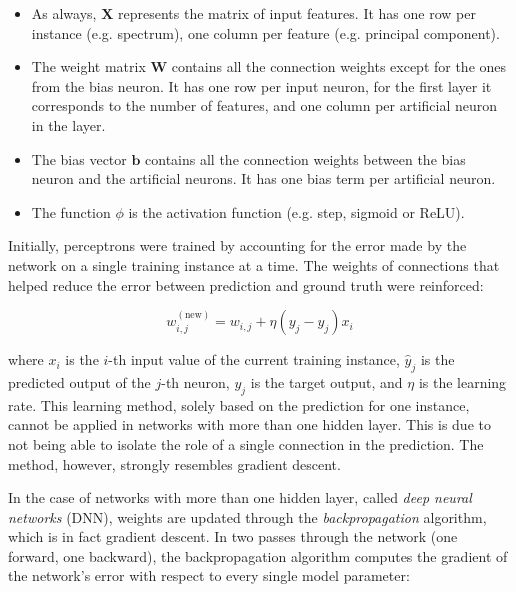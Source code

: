 \begin{itemize}
    \item As always, $\mathbf{X}$ represents the matrix of input features. It has one row per instance (e.g. spectrum), one column per feature (e.g. principal component).
    \item The weight matrix $\mathbf{W}$ contains all the connection weights except for the ones from the bias neuron. It has one row per input neuron, for the first layer it corresponds to the number of features, and one column per artificial neuron in the layer.
    \item The bias vector $\mathbf{b}$ contains all the connection weights between the bias neuron and the artificial neurons. It has one bias term per artificial neuron.
    \item The function $\phi$ is the activation function (e.g. step, sigmoid or ReLU).
\end{itemize}

Initially, perceptrons were trained by accounting for the error made by the network on a single training instance at a time. The weights of connections that helped reduce the error between prediction and ground truth were reinforced:

\begin{equation}
    w_{i,j}^{(\text{new})} = w_{i,j} + \eta \left( y_j - \hat{y}_j \right) x_i
    \label{eq:perceptron_update}
\end{equation}

where $x_i$ is the $i$-th input value of the current training instance, $\hat{y}_j$ is the predicted output of the $j$-th neuron, $y_j$ is the target output, and $\eta$ is the learning rate.
This learning method, solely based on the prediction for one instance, cannot be applied in networks with more than one hidden layer. This is due to not being able to isolate the role of a single connection in the prediction. The method, however, strongly resembles gradient descent.

In the case of networks with more than one hidden layer, called \textit{deep neural networks} (DNN), weights are updated through the \textit{backpropagation} algorithm, which is in fact gradient descent. In two
passes through the network (one forward, one backward), the backpropagation algorithm computes the gradient of the network's error with respect to every single model parameter:

